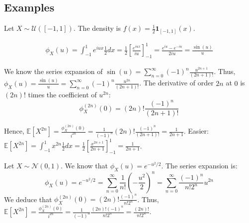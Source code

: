 \subsection*{Examples}%
\begin{example}
Let $X \sim \mathcal{U}([-1,1])$. The density is $f(x) = \frac{1}{2} \mathbf{1}_{[-1,1]}(x)$.

\begin{align*}
    \phi_X(u) = \int_{-1}^1 e^{iux} \frac{1}{2} dx = \frac{1}{2} \left[ \frac{e^{iux}}{iu} \right]_{-1}^1 = \frac{e^{iu} - e^{-iu}}{2iu} = \frac{\sin(u)}{u}
\end{align*}

We know the series expansion of $\sin(u) = \sum_{n=0}^\infty (-1)^n \frac{u^{2n+1}}{(2n+1)!}$.
Thus, $\phi_X(u) = \frac{\sin(u)}{u} = \sum_{n=0}^\infty (-1)^n \frac{u^{2n}}{(2n+1)!}$.
The derivative of order $2n$ at $0$ is $(2n)!$ times the coefficient of $u^{2n}$:
\[ \phi_X^{(2n)}(0) = (2n)! \frac{(-1)^n}{(2n+1)!} \]

Hence, $\mathbb{E}[X^{2n}] = \frac{\phi_X^{(2n)}(0)}{i^{2n}} = \frac{1}{(-1)^n} (2n)! \frac{(-1)^n}{(2n+1)!} = \frac{1}{2n+1}$.
Easier: $\mathbb{E}[X^{2n}] = \int_{-1}^1 x^{2n} \frac{1}{2} dx = \frac{1}{2} \left[ \frac{x^{2n+1}}{2n+1} \right]_{-1}^1 = \frac{1}{2n+1}$.
\end{example}%
\begin{example}
Let $X \sim \mathcal{N}(0,1)$. We know that $\phi_X(u) = e^{-u^2/2}$.
The series expansion is:
\[ \phi_X(u) = e^{-u^2/2} = \sum_{n=0}^\infty \frac{1}{n!} \left( -\frac{u^2}{2} \right)^n = \sum_{n=0}^\infty \frac{(-1)^n}{n! 2^n} u^{2n} \]
We deduce that $\phi_X^{(2n)}(0) = (2n)! \frac{(-1)^n}{n! 2^n}$.
Thus, $\mathbb{E}[X^{2n}] = \frac{\phi_X^{(2n)}(0)}{i^{2n}} = \frac{1}{(-1)^n} \frac{(2n)! (-1)^n}{n! 2^n} = \frac{(2n)!}{n! 2^n}$.
\end{example}%
